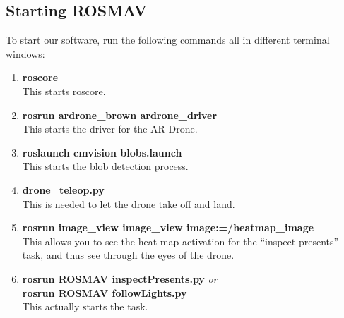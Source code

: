 \documentclass[a4paper,10pt]{article}
\begin{document}
\subsection{Starting ROSMAV}
To start our software, run the following commands all in different terminal windows:
\begin{enumerate}
\item \textbf{roscore} \\ This starts roscore.
\item \textbf{rosrun ardrone\_brown ardrone\_driver} \\ This starts the driver for the AR-Drone.
\item \textbf{roslaunch cmvision blobs.launch} \\ This starts the blob detection process.
\item \textbf{drone\_teleop.py} \\ This is needed to let the drone take off and land.
\item \textbf{rosrun image\_view image\_view image:=/heatmap\_image} \\ This
      allows you to see the heat map activation for the ``inspect presents''
      task, and thus see through the eyes of the drone.
\item \textbf{rosrun ROSMAV inspectPresents.py} \textit{or} \\
      \textbf{rosrun ROSMAV followLights.py} \\
      This actually starts the task. 
\end{enumerate}
\end{document}
